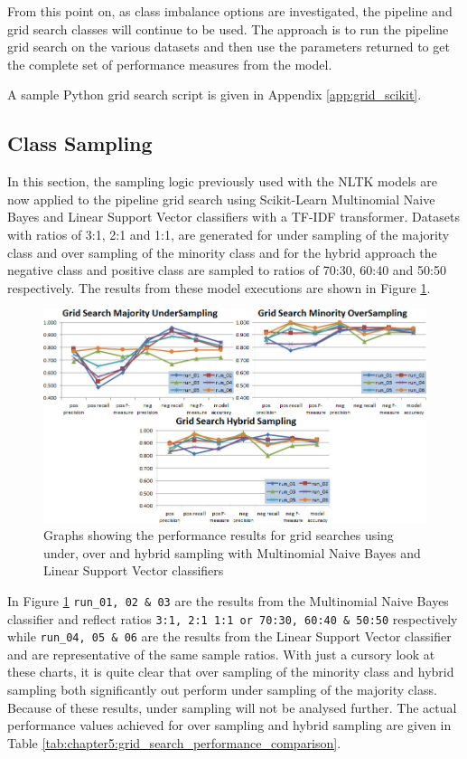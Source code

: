 From this point on, as class imbalance options are investigated, the pipeline and grid search classes will continue to be used. The approach is to run the pipeline grid search on the various datasets and then use the parameters returned to get the complete set of performance measures from the model.

A sample Python grid search script is given in Appendix \ref{app:grid_scikit}.

\subsection{Class Sampling}
In this section, the sampling logic previously used with the NLTK models are now applied to the pipeline grid search using Scikit-Learn Multinomial Naive Bayes and Linear Support Vector classifiers with a TF-IDF transformer. Datasets with ratios of 3:1, 2:1 and 1:1, are generated for under sampling of the majority class and over sampling of the minority class and for the hybrid approach the negative class and positive class are sampled to ratios of 70:30, 60:40 and 50:50 respectively. The results from these model executions are shown in Figure \ref{fig:scikit_process_chart_04}. 

\begin{figure}[htbp]
	\centering
	\includegraphics[width=1.0\textwidth]{Figures/Chapter5/scikit_process_chart_04.jpg}
	\caption[Scikit-Learn sampling with grid search results]{Graphs showing the performance results for grid searches using under, over and hybrid sampling with Multinomial Naive Bayes and Linear Support Vector classifiers}
	\label{fig:scikit_process_chart_04}
\end{figure}

In Figure \ref{fig:scikit_process_chart_04} \verb|run_01, 02 & 03| are the results from the Multinomial Naive Bayes classifier and reflect ratios \verb|3:1, 2:1 1:1 or 70:30, 60:40 & 50:50| respectively while \verb|run_04, 05 & 06| are the results from the Linear Support Vector classifier and are representative of the same sample ratios. With just a cursory look at these charts, it is quite clear that over sampling of the minority class and hybrid sampling both significantly out perform under sampling of the majority class. Because of these results, under sampling will not be analysed further. The actual performance values achieved for over sampling and hybrid sampling are given in Table \ref{tab:chapter5:grid_search_performance_comparison}.


